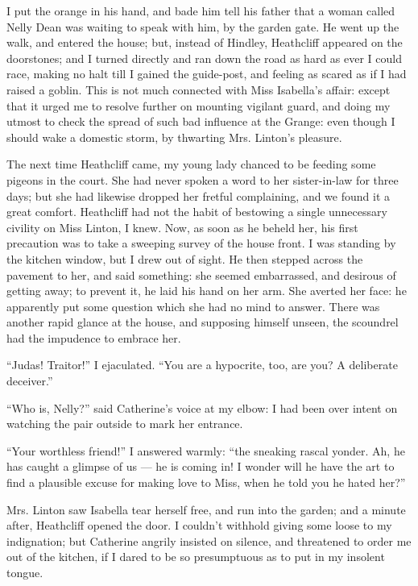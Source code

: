 \par I put the orange in his hand, and bade him tell his father that a woman called Nelly Dean was waiting to speak with him, by the garden gate. He went up the walk, and entered the house; but, instead of Hindley, Heathcliff appeared on the doorstones; and I turned directly and ran down the road as hard as ever I could race, making no halt till I gained the guide-post, and feeling as scared as if I had raised a goblin. This is not much connected with Miss Isabella's affair: except that it urged me to resolve further on mounting vigilant guard, and doing my utmost to check the spread of such bad influence at the Grange: even though I should wake a domestic storm, by thwarting Mrs. Linton's pleasure.
\par The next time Heathcliff came, my young lady chanced to be feeding some pigeons in the court. She had never spoken a word to her sister-in-law for three days; but she had likewise dropped her fretful complaining, and we found it a great comfort. Heathcliff had not the habit of bestowing a single unnecessary civility on Miss Linton, I knew. Now, as soon as he beheld her, his first precaution was to take a sweeping survey of the house front. I was standing by the kitchen window, but I drew out of sight. He then stepped across the pavement to her, and said something: she seemed embarrassed, and desirous of getting away; to prevent it, he laid his hand on her arm. She averted her face: he apparently put some question which she had no mind to answer. There was another rapid glance at the house, and supposing himself unseen, the scoundrel had the impudence to embrace her.
\par “Judas! Traitor!” I ejaculated. “You are a hypocrite, too, are you? A deliberate deceiver.”
\par “Who is, Nelly?” said Catherine's voice at my elbow: I had been over intent on watching the pair outside to mark her entrance.
\par “Your worthless friend!” I answered warmly: “the sneaking rascal yonder. Ah, he has caught a glimpse of us — he is coming in! I wonder will he have the art to find a plausible excuse for making love to Miss, when he told you he hated her?”
\par Mrs. Linton saw Isabella tear herself free, and run into the garden; and a minute after, Heathcliff opened the door. I couldn't withhold giving some loose to my indignation; but Catherine angrily insisted on silence, and threatened to order me out of the kitchen, if I dared to be so presumptuous as to put in my insolent tongue.
